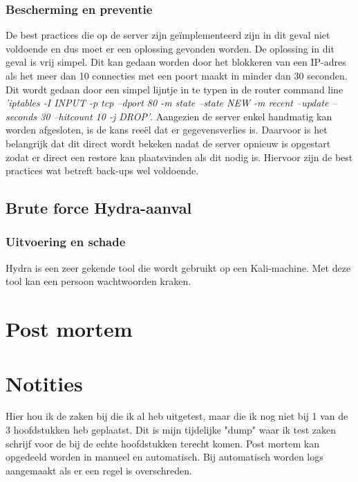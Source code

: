 \documentclass[pdftex,a4paper,12pt]{report}
\begin{document}
\subsection{Bescherming en preventie}
De best practices die op de server zijn geïmplementeerd zijn in dit geval niet voldoende en dus moet er een oplossing gevonden worden. De oplossing in dit geval is vrij simpel. Dit kan gedaan worden door het blokkeren van een IP-adres als het meer dan 10 connecties met een poort maakt in minder dan 30 seconden. Dit wordt gedaan door een simpel lijntje in te typen in de router command line \textit{'iptables -I INPUT -p tcp --dport 80 -m state --state NEW -m recent --update --seconds 30 --hitcount 10 -j DROP'}. Aangezien de server enkel handmatig kan worden afgesloten, is de kans reeël dat er gegevensverlies is. Daarvoor is het belangrijk dat dit direct wordt bekeken nadat de server opnieuw is opgestart zodat er direct een restore kan plaatsvinden als dit nodig is. Hiervoor zijn de best practices wat betreft back-ups wel voldoende. 

\section{Brute force Hydra-aanval}
\subsection{Uitvoering en schade}
Hydra is een zeer gekende tool die wordt gebruikt op een Kali-machine. Met deze tool kan een persoon wachtwoorden kraken.

\chapter{Post mortem}


\chapter{Notities}
Hier hou ik de zaken bij die ik al heb uitgetest, maar die ik nog niet bij 1 van de 3 hoofdstukken heb geplaatst. Dit is mijn tijdelijke "dump" waar ik test zaken schrijf voor de bij de echte hoofdstukken terecht komen.
\newpage
Post mortem kan opgedeeld worden in manueel en automatisch. Bij automatisch worden logs aangemaakt als er een regel is overschreden.
\end{document}
